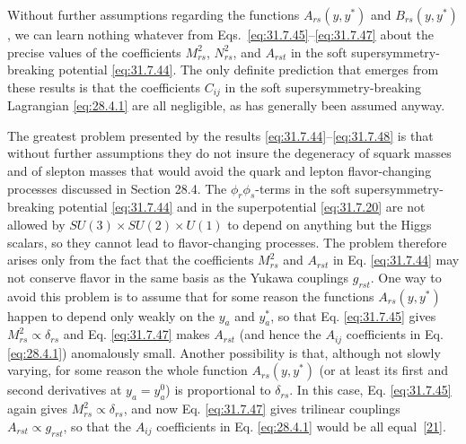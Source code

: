 Without further assumptions regarding the functions \(A_{rs}(y,y^*)\) and
\(B_{rs}(y,y^*)\), we can learn nothing whatever from
Eqs.~\eqref{eq:31.7.45}--\eqref{eq:31.7.47} about the precise values of the
coefficients \(M_{rs}^2\), \(N_{rs}^2\), and \(A_{rst}\) in the soft
supersymmetry-breaking potential \eqref{eq:31.7.44}. The only definite
prediction that emerges from these results is that the coefficients
\(C_{ij}\) in the soft supersymmetry-breaking Lagrangian \eqref{eq:28.4.1}
are all negligible, as has generally been assumed anyway.

The greatest problem presented by the results
\eqref{eq:31.7.44}--\eqref{eq:31.7.48} is that without further assumptions
they do not insure the degeneracy of squark masses and of slepton masses
that would avoid the quark and lepton flavor-changing processes discussed
in Section 28.4. The \(\phi_r\phi_s\)-terms in the soft
supersymmetry-breaking potential \eqref{eq:31.7.44} and in the
superpotential \eqref{eq:31.7.20} are not allowed by
\(SU(3)\times SU(2)\times U(1)\) to depend on anything but the Higgs scalars,
so they cannot lead to flavor-changing processes. The problem therefore
arises only from the fact that the coefficients \(M_{rs}^2\) and \(A_{rst}\)
in Eq. \eqref{eq:31.7.44} may not conserve flavor in the same basis as the
Yukawa couplings \(g_{rst}\). One way to avoid this problem is to assume
that for some reason the functions \(A_{rs}(y,y^*)\) happen to depend only
weakly on the \(y_a\) and \(y_a^*\), so that Eq. \eqref{eq:31.7.45} gives
\(M_{rs}^2\propto\delta_{rs}\) and Eq. \eqref{eq:31.7.47} makes \(A_{rst}\)
(and hence the \(A_{ij}\) coefficients in Eq. \eqref{eq:28.4.1})
anomalously small. Another possibility is that, although not slowly varying,
for some reason the whole function \(A_{rs}(y,y^*)\) (or at least its first
and second derivatives at \(y_a=y_a^0\)) is proportional to
\(\delta_{rs}\). In this case, Eq. \eqref{eq:31.7.45} again gives
\(M_{rs}^2\propto\delta_{rs}\), and now Eq. \eqref{eq:31.7.47} gives
trilinear couplings \(A_{rst}\propto g_{rst}\), so that the \(A_{ij}\)
coefficients in Eq. \eqref{eq:28.4.1} would be all
equal~\hyperref[ch31-ref-21]{[21]}.

